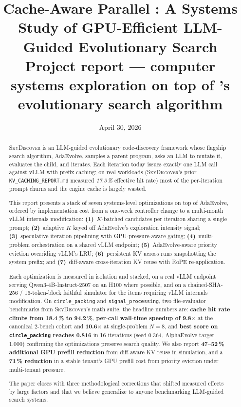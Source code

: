 \documentclass[11pt]{article}
\title{
  \vspace{-1.5em}
  \large \textbf{Cache-Aware Parallel \adaev{}: A Systems Study of GPU-Efficient LLM-Guided Evolutionary Search}\\[0.3em]
  \normalsize Project report --- computer systems exploration on top of \skyd{}'s evolutionary search algorithm
}
\date{April 30, 2026}
\newcommand{\skyd}{\textsc{SkyDiscover}}
\newcommand{\adaev}{AdaEvolve}
\begin{document}
\maketitle

\begin{abstract}
\noindent
\skyd{} is an LLM-guided evolutionary code-discovery framework whose
flagship search algorithm, \adaev{}, samples a parent program, asks an
LLM to mutate it, evaluates the child, and iterates. Each iteration
today issues exactly one LLM call against vLLM with prefix caching;
on real workloads (\skyd{}'s prior \texttt{KV\_CACHING\_REPORT.md}
measured \emph{17.3\,\%} effective hit rate) most of the per-iteration
prompt churns and the engine cache is largely wasted.

This report presents a stack of seven systems-level optimizations on
top of \adaev{}, ordered by implementation cost from a one-week
controller change to a multi-month vLLM internals modification:
\textbf{(1)}~$K$-batched candidates per iteration sharing a single prompt;
\textbf{(2)}~adaptive $K$ keyed off \adaev{}'s exploration intensity
signal; \textbf{(3)}~speculative iteration pipelining with
GPU-pressure-aware gating; \textbf{(4)}~multi-problem orchestration on
a shared vLLM endpoint; \textbf{(5)}~AdaEvolve-aware priority eviction
overriding vLLM's LRU; \textbf{(6)}~persistent KV across runs
snapshotting the system prefix; and \textbf{(7)}~diff-aware
cross-iteration KV reuse with RoPE re-application.

Each optimization is measured in isolation and stacked, on a real
vLLM endpoint serving Qwen3-4B-Instruct-2507 on an H100 where
possible, and on a chained-SHA-256 / 16-token-block faithful
simulator for the items requiring vLLM internals modification.
On \texttt{circle\_packing} and \texttt{signal\_processing}, two
file-evaluator benchmarks from \skyd{}'s math suite, the headline
numbers are: \textbf{cache hit rate climbs from 18.4\,\% to 94.2\,\%},
\textbf{per-call wall-time speedup of 9.8$\times$} at the canonical
2-bench cohort and \textbf{10.6$\times$} at single-problem $N\!=\!8$,
and \textbf{best score on \texttt{circle\_packing} reaches 0.816} in 16
iterations (seed 0.364, AlphaEvolve target 1.000) confirming the
optimizations preserve search quality. We also report \textbf{47--52\,\%
additional GPU prefill reduction} from diff-aware KV reuse in
simulation, and a \textbf{71\,\% reduction} in a stable tenant's GPU
prefill cost from priority eviction under multi-tenant pressure.

The paper closes with three methodological corrections that shifted
measured effects by large factors and that we believe generalize to
anyone benchmarking LLM-guided search systems.
\end{abstract}
\end{document}
